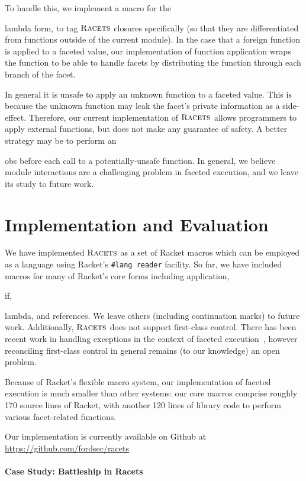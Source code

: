 \documentclass[review=true,acmlarge]{acmart}
\newcommand*{\SavedLstInline}{}
\DeclareRobustCommand*{\lstinline}{%
  \ifmmode
    \let\SavedBGroup\bgroup
    \def\bgroup{%
      \let\bgroup\SavedBGroup
      \hbox\bgroup
    }%
  \fi
  \SavedLstInline
}
\newcommand{\blue}[1] {{\color{colorMATH} #1}}
\newcommand{\code}[1]{\lstinline{#1}}
\newcommand{\racets}[0]{$\textsc{Racets}$\xspace}
\begin{document}
To handle this, we implement a macro for the \code{lambda} form, to
tag \racets closures specifically (so that they are differentiated from
functions outside of the current module). In the case that a foreign
function is applied to a faceted value, our implementation of function
application wraps the function to be able to handle facets by
distributing the function through each branch of the facet.

In general it is unsafe to apply an unknown function to a faceted
value. This is because the unknown function may leak the facet's
private information as a side-effect. Therefore, our current
implementation of \racets allows programmers to apply external
functions, but does not make any guarantee of safety. A better
strategy may be to perform an \code{obs} before each call to a
potentially-unsafe function. In general, we believe module
interactions are a challenging problem in faceted execution, and we
leave its study to future work.

\section{Implementation and Evaluation}

We have implemented \racets as a set of Racket macros which can be
employed as a language using Racket's \texttt{\#lang reader}
facility. So far, we have included macros for many of Racket's core
forms including application, \code{if}, \code{lambda}, and
references. We leave others (including continuation marks) to future
work. Additionally, \racets does not support first-class control. There
has been recent work in handling exceptions in the context of faceted
execution~\cite{Austin:17}, however reconciling first-class control in
general remains (to our knowledge) an open problem.

Because of Racket's flexible macro system, our implementation of
faceted execution is much smaller than other systems: our core macros
comprise roughly 170 source lines of Racket, with another 120 lines of
library code to perform various facet-related functions.

Our implementation is currently available on Github at
\blue{\url{https://github.com/fordsec/racets}}

\paragraph*{Case Study: Battleship in Racets}
\end{document}
